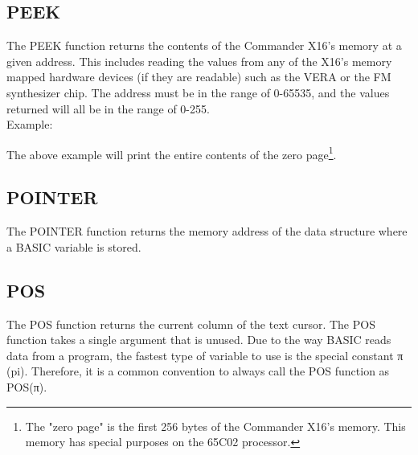 \subsection{PEEK}

The {\ttfamily PEEK} function returns the contents of the Commander X16's
memory at a given address.  This includes reading the values from any of the
X16's memory mapped hardware devices (if they are readable) such as the VERA or
the FM synthesizer chip.  The address must be in the range of 0-65535, and the
values returned will all be in the range of 0-255.\\

Example:\\


The above example will print the entire contents of the zero page\footnote{The
"zero page" is the first 256 bytes of the Commander X16's memory.  This memory
has special purposes on the 65C02 processor.}.\\

\subsection{POINTER}

The {\ttfamily POINTER} function returns the memory address of the data
structure where a BASIC variable is stored.\\


\subsection{POS}

The {\ttfamily POS} function returns the current column of the text cursor.
The {\ttfamily POS} function takes a single argument that is unused.  Due to
the way BASIC reads data from a program, the fastest type of variable to use is
the special constant {\ttfamily π} (pi).  Therefore, it is a common convention
to always call the {\ttfamily POS} function as {\ttfamily POS(π)}.\\


